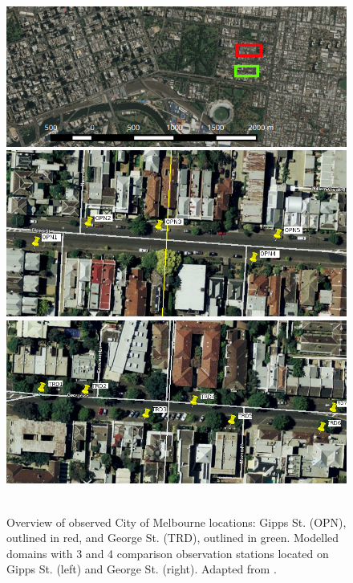 \documentclass[final,3p,times,authoryear]{elsarticle}
\begin{document}
\begin{figure}[!htbp] 
\center
\includegraphics[trim = 0mm 0mm 0mm 0mm, clip, scale=0.69]{images/CoMOverview.png}
\\
\includegraphics[trim = 0mm 0mm 0mm 6mm, clip, scale=0.35]{images/GippsStCrop.png}
\includegraphics[trim = 0mm 0mm 0mm 0mm, clip, scale=0.33]{images/GeorgeStCrop.png}~
\caption{Overview of observed City of Melbourne locations: Gipps St. (OPN), outlined in red, and George St. (TRD), outlined in green. Modelled domains with 3 and 4 comparison observation stations located on Gipps St. (left) and George St. (right). Adapted from \cite{GooglePreston2015}.
\label{fig:GeorgeGippsSt} 
} 
\end{figure}
\end{document}
